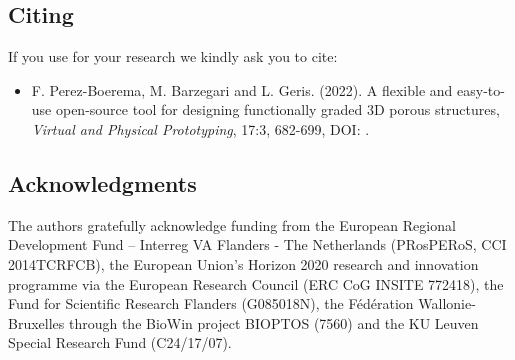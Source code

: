 \subsection{Citing \asli{}}
If you use \asli{} for your research we kindly ask you to cite:
\begin{itemize}
	\item F. Perez-Boerema, M. Barzegari and L. Geris. (2022). A flexible and easy-to-use open-source tool for designing functionally graded 3D porous structures, \textit{Virtual and Physical Prototyping}, 17:3, 682-699, DOI: \href{https://doi.org/10.1080/17452759.2022.2048956}{}.
	
\end{itemize}

\subsection{Acknowledgments}
The authors gratefully acknowledge funding from the European Regional Development Fund – Interreg VA Flanders - The Netherlands (PRosPERoS, CCI 2014\-TC\-RFCB), the European Union’s Horizon 2020 research and innovation programme via the European Research Council (ERC CoG INSITE 772418), the Fund for Scientific Research Flanders (G085018N), the Fédération Wallonie-Bruxelles through the BioWin project BIOPTOS (7560) and the KU Leuven Special Research Fund (C24/17/07).